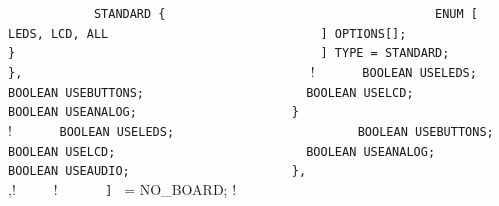 {{{{{\lstinline!            STANDARD {                       ! \newline
\lstinline!              ENUM [                         ! \newline
\lstinline!                LEDS, LCD, ALL               ! \newline
\lstinline!              ] OPTIONS[];                   ! \newline
\lstinline!            }                                ! \newline
\lstinline!          ] TYPE = STANDARD;                 ! \newline
\lstinline!        },                                   ! \newline
\lstinline!	   !\quad \quad{} {  ! \newline
\lstinline!	     BOOLEAN USELEDS;                   ! \newline
\lstinline!	     BOOLEAN USEBUTTONS;                ! \newline
\lstinline!	     BOOLEAN USELCD;                    ! \newline
\lstinline!	     BOOLEAN USEANALOG;                 ! \newline
\lstinline!	   }                                    ! \newline
\lstinline!	   !\quad \quad{} {  ! \newline
\lstinline!	     BOOLEAN USELEDS;                   ! \newline
\lstinline!	     BOOLEAN USEBUTTONS;                ! \newline
\lstinline!	     BOOLEAN USELCD;                    ! \newline
\lstinline!	     BOOLEAN USEANALOG;                 ! \newline
\lstinline!	     BOOLEAN USEAUDIO;                  ! \newline
\lstinline!	   },                                    ! \newline
\lstinline!	   !\quad \quad{},! \newline
\lstinline!	   !\quad \quad{}   ! \newline
\lstinline!      ] ! = NO_BOARD;  ! \newline
\lstinline!                                             ! \newline
}}}}}}}
